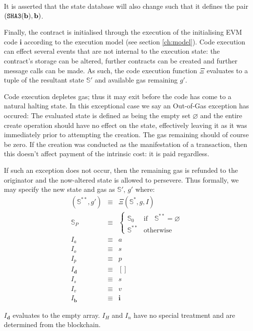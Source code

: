 \documentclass[9pt,oneside]{amsart}
\begin{document}
\begin{multicols}{2}
It is asserted that the state database will also change such that it defines the pair $(\mathtt{\tiny SHA3}(\mathbf{b}), \mathbf{b})$.

Finally, the contract is initialised through the execution of the initialising EVM code $\mathbf{i}$ according to the execution model (see section \ref{ch:model}). Code execution can effect several events that are not internal to the execution state: the contract's storage can be altered, further contracts can be created and further message calls can be made. As such, the code execution function $\Xi$ evaluates to a tuple of the resultant state $\mathbb{S}'$ and available gas remaining $g'$.

Code execution depletes gas; thus it may exit before the code has come to a natural halting state. In this exceptional case we say an Out-of-Gas exception has occured: The evaluated state is defined as being the empty set $\varnothing$ and the entire create operation should have no effect on the state, effectively leaving it as it was immediately prior to attempting the creation. The gas remaining should of course be zero. If the creation was conducted as the manifestation of a transaction, then this doesn't affect payment of the intrinsic cost: it is paid regardless.

If such an exception does not occur, then the remaining gas is refunded to the originator and the now-altered state is allowed to persevere. Thus formally, we may specify the new state and gas as $\mathbb{S}'$, $g'$ where:
\begin{eqnarray}
(\mathbb{S}^{**}, g') & \equiv & \Xi(\mathbb{S}^*, g, I) \\
\mathbb{S}_P & \equiv & \begin{cases}
\mathbb{S}_0 & \text{if} \quad \mathbb{S}^{**} = \varnothing \\
\mathbb{S}^{**} & \text{otherwise}
\end{cases} \\
I_a & \equiv & a \\
I_o & \equiv & s \\
I_p & \equiv & p \\
I_\mathbf{d} & \equiv & [] \\
I_s & \equiv & s \\
I_v & \equiv & v \\
I_\mathbf{b} & \equiv & \mathbf{i}
\end{eqnarray}

$I_\mathbf{d}$ evaluates to the empty array. $I_H$ and $I_n$ have no special treatment and are determined from the blockchain.


\end{multicols}
\end{document}
